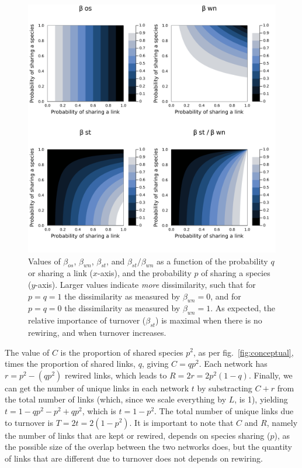 \documentclass[10pt,oneside]{article}
\makeatletter
\def\maxwidth{\ifdim\Gin@nat@width>\linewidth\linewidth
\else\Gin@nat@width\fi}
\let\Oldincludegraphics\includegraphics
\renewcommand{\includegraphics}[1]{\Oldincludegraphics[width=\maxwidth]{#1}}
\makeatother
\begin{document}
\begin{figure}
\hypertarget{fig:turnrew}{%
\centering
\includegraphics{figures/sharing_v_rewiring/components.png}
\caption{Values of \(\beta_{os}\), \(\beta_{wn}\), \(\beta_{st}\), and
\(\beta_{st}/\beta_{wn}\) as a function of the probability \(q\) or
sharing a link (\(x\)-axis), and the probability \(p\) of sharing a
species (\(y\)-axis). Larger values indicate \emph{more} dissimilarity,
such that for \(p=q=1\) the dissimilarity as measured by
\(\beta_{wn}=0\), and for \(p=q=0\) the dissimilarity as measured by
\(\beta_{wn}=1\). As expected, the relative importance of turnover
(\(\beta_{st}\)) is maximal when there is no rewiring, and when turnover
increases.}\label{fig:turnrew}
}
\end{figure}

The value of \(C\) is the proportion of shared species \(p^2\), as per
fig.~\ref{fig:conceptual}, times the proportion of shared links, \(q\),
giving \(C = qp^2\). Each network has \(r = p^2-(qp^2)\) rewired links,
which leads to \(R = 2r = 2p^2(1-q)\). Finally, we can get the number of
unique links in each network \(t\) by substracting \(C+r\) from the
total number of links (which, since we scale everything by \(L\), is 1),
yielding \(t = 1 - qp^2 - p^2 + qp^2\), which is \(t = 1-p^2\). The
total number of unique links due to turnover is \(T = 2t = 2(1-p^2)\).
It is important to note that \(C\) and \(R\), namely the number of links
that are kept or rewired, depends on species sharing (\(p\)), as the
possible size of the overlap between the two networks does, but the
quantity of links that are different due to turnover does not depends on
rewiring.
\end{document}
